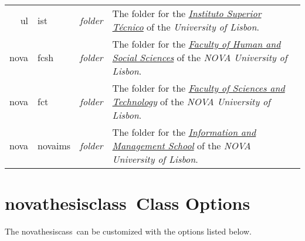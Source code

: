 \noindent
\begin{tabularx}{\linewidth}{>{\ttfamily}r@{~/~}>{\ttfamily}l>{\itshape}l>{\upshape}X}
ul     & ist    & folder  & 
The folder for the \href{http://www.tecnico.ulisboa.pt}{\emph{Instituto Superior Técnico}} of the \emph{University of Lisbon}.
\\
nova    & fcsh   & folder  & 
The folder for the \href{http:www.fcsh.unl.pt}{\emph{Faculty of Human and Social Sciences}}  of the \emph{NOVA University of Lisbon}.
\\
nova    & fct    & folder  & 
The folder for the \href{http:www.fct.unl.pt}{\emph{Faculty of Sciences and Technology}} of the \emph{NOVA University of Lisbon}.
\\
nova    & novaims    & folder  & 
The folder for the \href{http:www.novaims.unl.pt}{\emph{Information and Management School}} of the \emph{NOVA University of Lisbon}.
\\
\end{tabularx}


\section{\gls{novathesisclass}\ Class Options} %
\label{sec:package_options}

The \gls{novathesiscass}\ can be customized with the options listed below.

\newcommand{\classoption}[3]{\textbf{#1=OPT}\qquad #2\\\qquad\emph{#3}\\}

